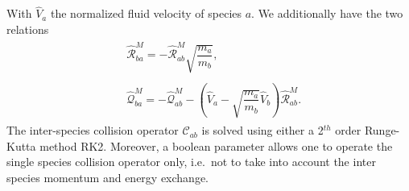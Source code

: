 \documentclass[11pt]{article}
\begin{document}
  With $\hat{V}_a$ the normalized fluid velocity of species $a$. We additionally have the two relations 
%
  \begin{align}
 & \begin{aligned}
    \hat{\mathcal{R}}_{ba}^{M} = - \hat{\mathcal{R}}_{ab}^{M} \sqrt{\dfrac{m_a}{m_b}},
\end{aligned}\\
 & \begin{aligned}
   \hat{\mathcal{Q}}_{ba}^{M} = - \hat{\mathcal{Q}}_{ab}^{M} - \left( \hat{V}_a - \sqrt{\dfrac{m_a}{m_b}} \hat{V}_b \right) \hat{\mathcal{R}}_{ab}^{M}.
 \end{aligned}
  \end{align}
%
The inter-species collision operator $\mathcal{C}_{ab}$ is solved using either a 2$^{th}$ order Runge-Kutta method RK2. Moreover, a boolean parameter allows one to operate the single species collision operator only, i.e.\ not to take into account the inter species momentum and energy exchange.

\newpage
\appendix
\end{document}
